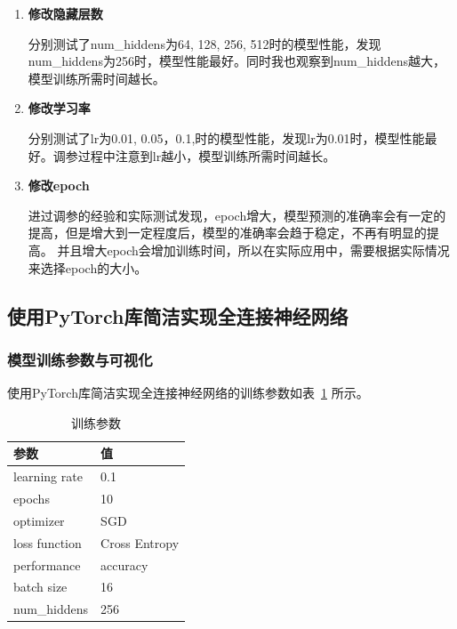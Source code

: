 \documentclass[12pt]{article}
\begin{document}
\begin{enumerate}
  \item \textbf{修改隐藏层数}

        分别测试了num\_hiddens为64, 128, 256, 512时的模型性能，发现num\_hiddens为256时，模型性能最好。同时我也观察到num\_hiddens越大，
        模型训练所需时间越长。
  \item \textbf{修改学习率}

        分别测试了lr为0.01, 0.05，0.1,时的模型性能，发现lr为0.01时，模型性能最好。调参过程中注意到lr越小，模型训练所需时间越长。
  \item \textbf{修改epoch}

        进过调参的经验和实际测试发现，epoch增大，模型预测的准确率会有一定的提高，但是增大到一定程度后，模型的准确率会趋于稳定，不再有明显的提高。
        并且增大epoch会增加训练时间，所以在实际应用中，需要根据实际情况来选择epoch的大小。
\end{enumerate}




\subsection{使用PyTorch库简洁实现全连接神经网络}

\subsubsection{模型训练参数与可视化}
使用PyTorch库简洁实现全连接神经网络的训练参数如表~\ref{tab:training-params} 所示。
\begin{table}[htbp]
  \centering
  \caption{训练参数}
  \label{tab:training-params}
  \begin{tabular}{m{3cm}<{\centering}m{3cm}<{\centering}}
    \toprule
    \textbf{参数}   & \textbf{值}    \\[\medskipamount]
    \midrule
    learning rate & 0.1           \\[\medskipamount]
    epochs        & 10            \\[\medskipamount]
    optimizer     & SGD           \\[\medskipamount]
    loss function & Cross Entropy \\[\medskipamount]
    performance   & accuracy      \\[\medskipamount]
    batch size    & 16            \\[\medskipamount]
    num\_hiddens  & 256           \\[\medskipamount]
    \bottomrule
  \end{tabular}
\end{table}
\end{document}
